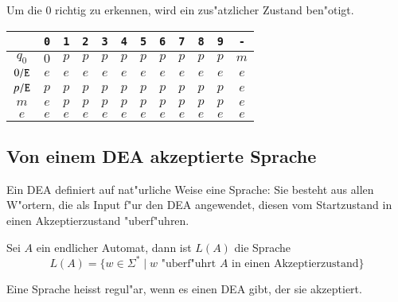 \begin{beispiel} Um die $0$ richtig zu erkennen,
wird ein zus"atzlicher Zustand ben"otigt.

\begin{center}
\begin{tabular}{|c|ccccccccccc|}
\hline
&\tt 0&\tt 1&\tt 2&\tt 3&\tt 4&\tt 5&\tt 6&\tt 7&\tt 8&\tt 9&\tt -\\
\hline
$q_0$&$0$&$p$&$p$&$p$&$p$&$p$&$p$&$p$&$p$&$p$&$m$\\
$0{\tt /E}$&$e$&$e$&$e$&$e$&$e$&$e$&$e$&$e$&$e$&$e$&$e$\\
$p{\tt /E}$&$p$&$p$&$p$&$p$&$p$&$p$&$p$&$p$&$p$&$p$&$e$\\
$m$&$e$&$p$&$p$&$p$&$p$&$p$&$p$&$p$&$p$&$p$&$e$\\
$e$&$e$&$e$&$e$&$e$&$e$&$e$&$e$&$e$&$e$&$e$&$e$\\
\hline
\end{tabular}
\end{center}

\end{beispiel}

\subsection{Von einem DEA akzeptierte Sprache\label{regulaer:akzeptiertesprache}}
Ein DEA definiert auf nat"urliche Weise eine Sprache: Sie besteht aus
allen W"ortern, die als Input f"ur den DEA angewendet, diesen vom
Startzustand in einen Akzeptierzustand "uberf"uhren.

\begin{definition}
Sei $A$ ein endlicher Automat, dann ist $L(A)$ die Sprache
\[
L(A)=\{w\in\Sigma^*\;|\; \text{$w$ "uberf"uhrt $A$ in einen Akzeptierzustand}\}
\]
\end{definition}

\begin{definition}
\label{regulaer:definition:regulaere-sprache}
Eine Sprache heisst regul"ar, wenn es einen DEA gibt, der sie
akzeptiert.
\end{definition}

